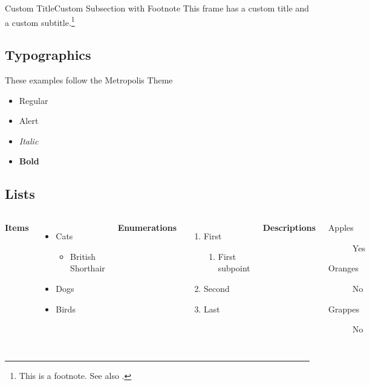 \documentclass[
11pt,notheorems,hyperref={pdfauthor=whatever}
]{beamer}
\begin{document}
\begin{frame}{Custom Title}{Custom Subsection with Footnote}
    This frame has a custom title and a custom subtitle.\footnote{This is a footnote. See also \textcite{example_2022}. }
\end{frame}

\subsection{Typographics}
\begin{frame}
    These examples follow the Metropolis Theme
    \begin{itemize}
        \item Regular
        \item \alert{Alert}
        \item \textit{Italic}
        \item \textbf{Bold}
    \end{itemize}
\end{frame}

\subsection{Lists}

\begin{frame}
    \begin{columns}[T,onlytextwidth]
      \textbf{Items}
      \begin{itemize}
        \item Cats 
        \begin{itemize}
            \item British Shorthair
        \end{itemize}
        \item Dogs \item Birds
      \end{itemize}

      \textbf{Enumerations}
      \begin{enumerate}
        \item First 
        \begin{enumerate}
            \item First subpoint
        \end{enumerate}
        \item Second \item Last
      \end{enumerate}

      \textbf{Descriptions}
      \begin{description}
        \item[Apples] Yes \item[Oranges] No \item[Grappes] No
      \end{description}
\end{columns}
\end{frame}
\end{document}

